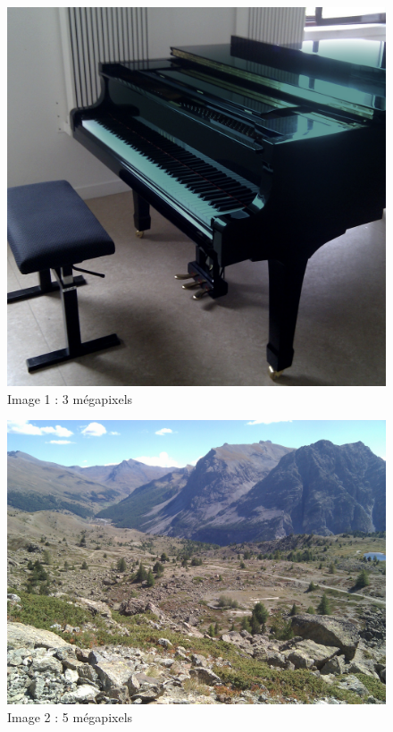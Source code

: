 \documentclass{article}
\begin{document}
\clearpage

\begin{figure}[!h]
\centering
\includegraphics[scale=0.2]{images/piano_bleu.jpg}
\caption{Image 1 : 3 mégapixels}
\label{3}
\end{figure}

\begin{figure}[!h]
\centering
\includegraphics[scale=0.15]{images/alpes.jpg}
\caption{Image 2 : 5 mégapixels}
\label{5}
\end{figure}
\end{document}
